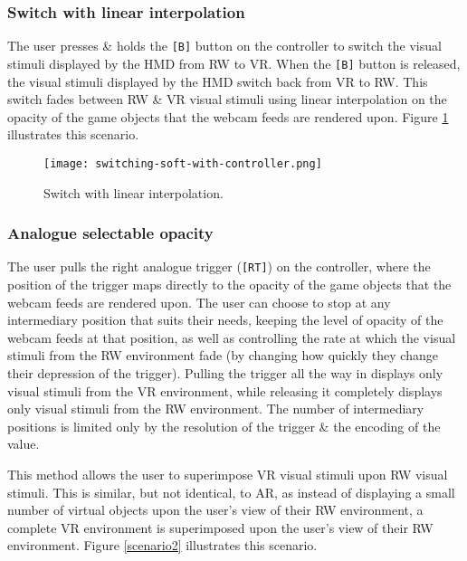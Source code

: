 \subsubsection{Switch with linear interpolation}
The user presses \& holds the \texttt{[B]} button on the controller to switch the visual stimuli displayed by the HMD from RW to VR. When the \texttt{[B]} button is released, the visual stimuli displayed by the HMD switch back from VR to RW. This switch fades between RW \& VR  visual stimuli using linear interpolation on the opacity of the game objects that the webcam feeds are rendered upon. Figure \ref{scenario12} illustrates this scenario.

\begin{figure}[h]
	\begin{center}
		\texttt{[image: switching-soft-with-controller.png]}
		\caption{Switch with linear interpolation.}
		\label{scenario12}
	\end{center}
\end{figure}


\subsubsection{Analogue selectable opacity}
The user pulls the right analogue trigger (\texttt{[RT]}) on the controller, where the position of the trigger maps directly to the opacity of the game objects that the webcam feeds are rendered upon. The user can choose to stop at any intermediary position that suits their needs, keeping the level of opacity of the webcam feeds at that position, as well as controlling the rate at which the visual stimuli from the RW environment fade (by changing how quickly they change their depression of the trigger). Pulling the trigger all the way in displays only visual stimuli from the VR environment, while releasing it completely displays only visual stimuli from the RW environment. The number of intermediary positions is limited only by the resolution of the trigger \& the encoding of the value.

This method allows the user to superimpose VR visual stimuli upon RW visual stimuli. This is similar, but not identical, to AR, as instead of displaying a small number of virtual objects upon the user's view of their RW environment, a complete VR environment is superimposed upon the user's view of their RW environment. Figure \ref{scenario2} illustrates this scenario.

